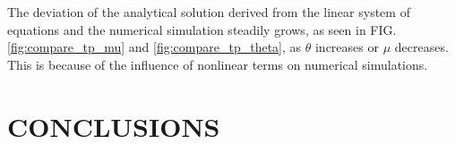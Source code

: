 \documentclass[aps,prd,twocolumn,amsmath,amssymb,groupedaddress]{revtex4-2}
\begin{document}
The deviation of the analytical solution derived from the linear system of equations and the numerical simulation steadily grows, as seen in FIG. \ref{fig:compare_tp_mu} and \ref{fig:compare_tp_theta}, as $\theta$ increases or $\mu$ decreases. This is because of the influence of nonlinear terms on numerical simulations.

\section{\label{sec:conclusion} CONCLUSIONS}


%


\end{document}
